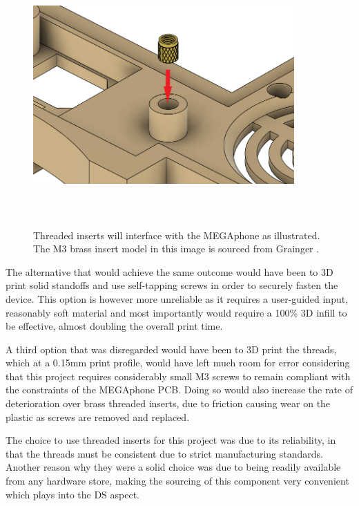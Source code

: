\begin{figure} [h]
    \centering
    \includegraphics[width=10cm,height=10cm,keepaspectratio]{Figures/threaded_insert.png}
    \caption{Threaded inserts will interface with the MEGAphone as illustrated. The M3 brass insert model in this image is sourced from Grainger \cite{insert}.}
    \label{fig:Threads}
\end{figure}

The alternative that would achieve the same outcome would have been to 3D print solid standoffs and use self-tapping screws in order to securely fasten the device.
This option is however more unreliable as it requires a user-guided input, reasonably soft material and most importantly would require a 100\% 3D infill to be effective, almost doubling the overall print time.

A third option that was disregarded would have been to 3D print the threads, which at a 0.15mm print profile, would have left much room for error considering that this project requires considerably small M3 screws to remain compliant with the constraints of the MEGAphone PCB.
Doing so would also increase the rate of deterioration over brass threaded inserts, due to friction causing wear on the plastic as screws are removed and replaced.

The choice to use threaded inserts for this project was due to its reliability, in that the threads must be consistent due to strict manufacturing standards.
Another reason why they were a solid choice was due to being readily available from any hardware store, making the sourcing of this component very convenient which plays into the DS aspect.

